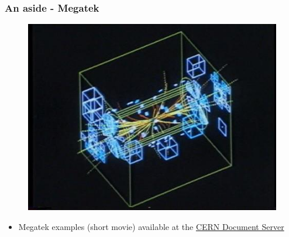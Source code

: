 \documentclass[xcolor=table]{beamer}
\begin{document}
\begin{frame}
\frametitle{An aside - Megatek}
\fontsize{9pt}{12}\selectfont

\begin{figure}[h]
\centering
\includegraphics[height=0.6\textheight]{images/megatek.jpg}
\end{figure}

\begin{itemize}
\item Megatek examples (short movie) available at the \href{https://cds.cern.ch/record/1049887?ln=en}{CERN Document Server}
\end{itemize}

\end{frame}

\end{document}

